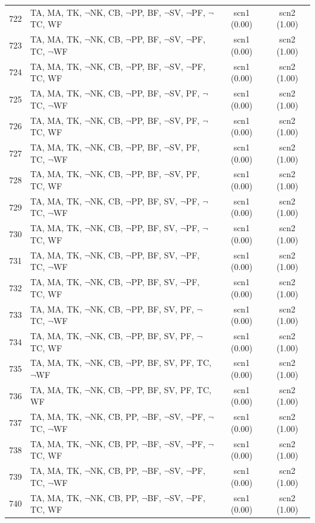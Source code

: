 \documentclass[12pt]{article}
\begin{document}
\begin{longtable}{|l|l|c|c|}
722 & TA, MA, TK, $\neg$NK, CB, $\neg$PP, BF, $\neg$SV, $\neg$PF, $\neg$TC, WF & scn1 (0.00) & scn2 (1.00)\\
723 & TA, MA, TK, $\neg$NK, CB, $\neg$PP, BF, $\neg$SV, $\neg$PF, TC, $\neg$WF & scn1 (0.00) & scn2 (1.00)\\
724 & TA, MA, TK, $\neg$NK, CB, $\neg$PP, BF, $\neg$SV, $\neg$PF, TC, WF & scn1 (0.00) & scn2 (1.00)\\
725 & TA, MA, TK, $\neg$NK, CB, $\neg$PP, BF, $\neg$SV, PF, $\neg$TC, $\neg$WF & scn1 (0.00) & scn2 (1.00)\\
726 & TA, MA, TK, $\neg$NK, CB, $\neg$PP, BF, $\neg$SV, PF, $\neg$TC, WF & scn1 (0.00) & scn2 (1.00)\\
727 & TA, MA, TK, $\neg$NK, CB, $\neg$PP, BF, $\neg$SV, PF, TC, $\neg$WF & scn1 (0.00) & scn2 (1.00)\\
728 & TA, MA, TK, $\neg$NK, CB, $\neg$PP, BF, $\neg$SV, PF, TC, WF & scn1 (0.00) & scn2 (1.00)\\
729 & TA, MA, TK, $\neg$NK, CB, $\neg$PP, BF, SV, $\neg$PF, $\neg$TC, $\neg$WF & scn1 (0.00) & scn2 (1.00)\\
730 & TA, MA, TK, $\neg$NK, CB, $\neg$PP, BF, SV, $\neg$PF, $\neg$TC, WF & scn1 (0.00) & scn2 (1.00)\\
731 & TA, MA, TK, $\neg$NK, CB, $\neg$PP, BF, SV, $\neg$PF, TC, $\neg$WF & scn1 (0.00) & scn2 (1.00)\\
732 & TA, MA, TK, $\neg$NK, CB, $\neg$PP, BF, SV, $\neg$PF, TC, WF & scn1 (0.00) & scn2 (1.00)\\
733 & TA, MA, TK, $\neg$NK, CB, $\neg$PP, BF, SV, PF, $\neg$TC, $\neg$WF & scn1 (0.00) & scn2 (1.00)\\
734 & TA, MA, TK, $\neg$NK, CB, $\neg$PP, BF, SV, PF, $\neg$TC, WF & scn1 (0.00) & scn2 (1.00)\\
735 & TA, MA, TK, $\neg$NK, CB, $\neg$PP, BF, SV, PF, TC, $\neg$WF & scn1 (0.00) & scn2 (1.00)\\
736 & TA, MA, TK, $\neg$NK, CB, $\neg$PP, BF, SV, PF, TC, WF & scn1 (0.00) & scn2 (1.00)\\
737 & TA, MA, TK, $\neg$NK, CB, PP, $\neg$BF, $\neg$SV, $\neg$PF, $\neg$TC, $\neg$WF & scn1 (0.00) & scn2 (1.00)\\
738 & TA, MA, TK, $\neg$NK, CB, PP, $\neg$BF, $\neg$SV, $\neg$PF, $\neg$TC, WF & scn1 (0.00) & scn2 (1.00)\\
739 & TA, MA, TK, $\neg$NK, CB, PP, $\neg$BF, $\neg$SV, $\neg$PF, TC, $\neg$WF & scn1 (0.00) & scn2 (1.00)\\
740 & TA, MA, TK, $\neg$NK, CB, PP, $\neg$BF, $\neg$SV, $\neg$PF, TC, WF & scn1 (0.00) & scn2 (1.00)\\

\end{longtable}
\end{document}
